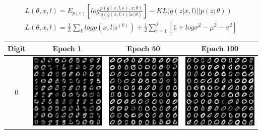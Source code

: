 \documentclass[12pt,a4paper]{article}
\begin{document}
	\begin{align*}
		L(\theta, x, l) = E_{p(\epsilon)}[log\frac{p(g(x,l,\epsilon),x;\theta)}{q(g(x,l,\epsilon)|x;\theta)}]- KL(q(z|x, l)||p(z;\theta)) \\
		L(\theta, x, l) = \frac{1}{L}\sum_{k}logp(x,l|z^{(k)}) +\frac{1}{2}\sum_{i=1}^{j}[1+log\sigma^2-\mu^2-\sigma^2]
	\end{align*}
	\begin{table}
		\centering
		\begin{tabular}{cccc}
			\toprule
			Digit & Epoch 1 & Epoch 50 & Epoch 100 \\
			\midrule
			0 & \includegraphics[width=4cm]{Figures/Epoch1_Label0} & \includegraphics[width=4cm]{Figures/Epoch50_Label0} & \includegraphics[width=4cm]{Figures/Epoch100_Label0}  \\

\end{tabular}
\end{table}
\end{document}
